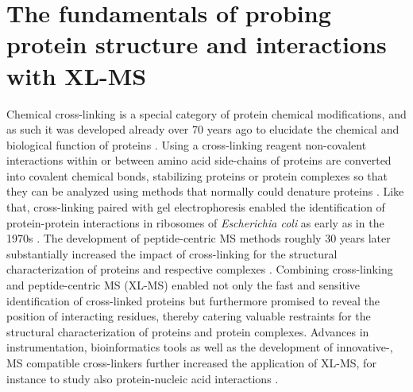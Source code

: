 \section{The fundamentals of probing protein structure and interactions with XL-MS}
Chemical cross-linking is a special category of protein chemical modifications, and as such it was developed already over 70 years ago to elucidate the chemical and biological function of proteins \cite{French_1945}. Using a cross-linking reagent non-covalent interactions within or between amino acid side-chains of proteins are converted into covalent chemical bonds, stabilizing proteins or protein complexes so that they can be analyzed using methods that normally could denature proteins \cite{Means_1998, Naowarojna_2021}. Like that, cross-linking paired with gel electrophoresis enabled the identification of protein-protein interactions in ribosomes of \emph{Escherichia coli} as early as in the 1970s \cite{Clegg_1974, Sun_1974}. The development of peptide-centric MS methods roughly 30 years later substantially increased the impact of cross-linking for the structural characterization of proteins and respective complexes \cite{Rappsilber_2011, Rappsilber_2000}. Combining cross-linking and peptide-centric MS (XL-MS) enabled not only the fast and sensitive identification of cross-linked proteins but furthermore promised to reveal the position of interacting residues, thereby catering valuable restraints for the structural characterization of proteins and protein complexes. Advances in instrumentation, bioinformatics tools as well as the development of innovative-, MS compatible cross-linkers further increased the application of XL-MS, for instance to study also protein-nucleic acid interactions \cite{Gotze_2021, Wong_1991}.
%
